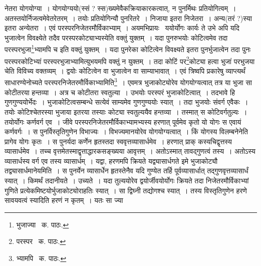 \documentclass[11pt, openany]{book}
\begin{document}
\noindent नेतरा योगयोग्या~। योगयोग्ययो(स्सं ? स्स)ख्यमेवैकक्रियाकारकत्वात्, न पुनर्मिथः प्रतियोगित्वम्~। अतस्तयोर्निजत्वमेवेतरेतरम्~। तयोः प्रतियोगिन्यौ पुनरितरे~। निजाया इतरा निजेतरा~। अन्य(तरं ?)स्या इतरा अन्येतरा~। एवं परस्परनिजेतरमौर्विकाभ्याम्~। अयमभिप्रायः \textendash\ ययोर्योगः कार्यः ते उभे अपि यदि भुजात्वेन विवक्ष्येते तदैव परस्परकोट्याभ्यस्येति वक्तुं युक्तम्~। यदा पुनरुभयोः कोटित्वमेव तदा परस्परभुजा\renewcommand{\thefootnote}{१}\footnote{भुजाज्या \textendash\ क. पाठः.}भ्यामपि च इति वक्तुं युक्तम्~। यदा पुनरेका कोटित्वेन विवक्ष्यते इतरा पुनर्भुजात्वेन तदा पुनः परस्परकोटिभ्यां परस्परभुजाभ्यामित्युभयमपि वक्तुं न युक्तम्~। तदा कोटिं पर\renewcommand{\thefootnote}{२}\footnote{परस्पर \textendash\ क. पाठः.}कोट्या हत्वा भुजां परभुजया चेति विविच्य वक्तव्यम्~। द्वयोः कोटित्वेन वा भुजात्वेन वा साम्याभावात्~। एवं त्रिष्वपि प्रकारेषु व्याप्त्यर्थं साधारण्येनोच्यते परस्परनिजेतरमौर्विकाभ्यामिति\renewcommand{\thefootnote}{३}\footnote{भ्यामपि \textendash\ क. पाठः.}~। एवमत्र भुजाकोट्योरेव योगयोग्यत्वात् तत्र या भुजा सा कोटीतरया हन्तव्या~। अत्र च कोटीतरा स्वतुल्या~। उभयोः परस्परं भुजाकोटित्वात्~। तदभावे हि गुणगुण्ययोर्भेदः~। भुजाकोटित्वसम्बन्धे सत्येवं साम्यमेव गुणगुण्ययोः स्यात्~। तदा भुजयोः संवर्ग एवैकः~। तयोः कोटिश्चेतरस्या भुजाया इतरया तस्याः कोट्या स्वतुल्ययैव हन्तव्या~। तस्मात् स कोटिवर्गतुल्यः~। तयोर्योगः कर्णवर्ग एव~। जीवे परस्परनिजेतरमौर्विकाभ्यामभ्यस्य हरणात् पूर्वमेव कृतो यो योगः स एवायं कर्णवर्गः~। स पुनर्विस्तृतिगुणेन विभाज्यः~। विभज्यमानयोरेव योगयोग्यत्वात्~। किं योगस्य विलम्बनेनेति प्रागेव योगः कृतः~। स पुनर्यदा कर्णेन हृतस्तदा स्ववृत्तव्यासार्धमेव~। हरणात् प्राक् कस्यचिद्वृत्तस्य व्यासार्धमेव~। तच्च वृत्तमेतस्माद्वृत्ताद्धारकसङ्ख्यया आवृत्तम्~। अतोऽस्मात् तावद्गुणत्वं तस्य~। अतोऽस्य व्यासार्धस्य वर्ग एव तस्य व्यासार्धम्~। यद्वा, हरणमपि क्रियते यद्व्यासार्धगते इमे भुजाकोट्यौ तद्व्यासार्धमानेयमिति~। स पुनर्येन व्यासार्धेन हृतस्तेनैव यदि गुण्येत तर्हि पूर्वव्यासार्धात् तद्गुणवृत्तव्यासार्धं स्यात्~। किमर्थं तदानीयते~। उच्यते~। यदा तुल्ययोरेव द्वयोर्जीवयोर्योगः क्रियते तदा निजेतरमौर्विकाभ्यां गुणिते प्रत्येकमिष्टयोर्भुजाकोट्योराहतिः स्यात्~। सा द्विघ्नी तद्योगश्च स्यात्~। तस्य विस्तृतिगुणेन हरणे सावयवत्वं स्यादिति हरणं न कृतम्~। यतः सा ज्या

\newpage 
\end{document}
